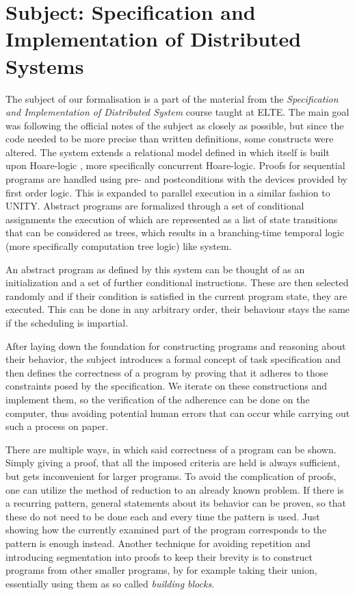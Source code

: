 \section{Subject: Specification and Implementation of Distributed Systems}
\label{sec:subject}

The subject of our formalisation is a part of the material from the \textit{Specification and Implementation of Distributed System} course taught at ELTE. The main goal was following the official notes of the subject\cite{hz-orsi} as closely as possible, but since the code needed to be more precise than written definitions, some constructs were altered. The system extends a relational model defined in \cite{fothi-prog} which itself is built upon Hoare-logic \cite{hoare1978proof}\cite{hoare-logic}, more specifically concurrent Hoare-logic\cite{Lamport1980}. Proofs for sequential programs are handled using pre- and postconditions with the devices provided by first order logic. This is expanded to parallel execution in a similar fashion to UNITY. Abstract programs are formalized through a set of conditional assignments the execution of which are represented as a list of state transitions that can be considered as trees, which results in a branching-time temporal logic \cite{emerson1988branching} (more specifically computation tree logic) like system.

An abstract program as defined by this system can be thought of as an initialization and a set of further conditional instructions. These are then selected randomly and if their condition is satisfied in the current program state, they are executed. This can be done in any arbitrary order, their behaviour stays the same if the scheduling is impartial.

After laying down the foundation for constructing programs and reasoning about their behavior, the subject introduces a formal concept of task specification and then defines the correctness of a program by proving that it adheres to those constraints posed by the specification. We iterate on these constructions and implement them, so the verification of the adherence can be done on the computer, thus avoiding potential human errors that can occur while carrying out such a process on paper.

There are multiple ways, in which said correctness of a program can be shown. Simply giving a proof, that all the imposed criteria are held is always sufficient, but gets inconvenient for larger programs. To avoid the complication of proofs, one can utilize the method of reduction to an already known problem. If there is a recurring pattern, general statements about its behavior can be proven, so that these do not need to be done each and every time the pattern is used. Just showing how the currently examined part of the program corresponds to the pattern is enough instead. Another technique for avoiding repetition and introducing segmentation into proofs to keep their brevity is to construct programs from other smaller programs, by for example taking their union, essentially using them as so called \textit{building blocks}.

